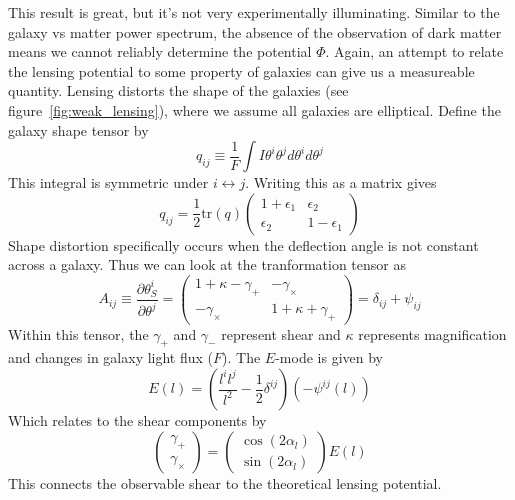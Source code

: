 This result is great, but it's not very experimentally illuminating. Similar to the galaxy vs matter power spectrum, the absence of the observation of dark matter means we cannot reliably determine the potential $\Phi$. Again, an attempt to relate the lensing potential to some property of galaxies can give us a measureable quantity. Lensing distorts the shape of the galaxies (see figure~\ref{fig:weak_lensing}), where we assume all galaxies are elliptical. Define the galaxy shape tensor by
\begin{equation}
	q_{ij} \equiv \frac{1}{F}\int I\theta^i\theta^j d\theta^i d\theta^j
\end{equation}
This integral is symmetric under $i \leftrightarrow j$. Writing this as a matrix gives
\begin{equation}
	q_{ij} = \frac{1}{2} \text{tr}(q) \left( 
	\begin{array}{cc}
	1+\epsilon_1 & \epsilon_2 \\
	\epsilon_2 & 1-\epsilon_1
	\end{array}
	\right)
\end{equation}
Shape distortion specifically occurs when the deflection angle is not constant across a galaxy. Thus we can look at the tranformation tensor as
\begin{equation}
	A_{ij} \equiv \frac{\partial \theta^i_S}{\partial\theta^j} = \left( 
	\begin{array}{cc}
	1+\kappa - \gamma_+ & -\gamma_\times \\
	-\gamma_\times & 1+\kappa+\gamma_+
	\end{array}
	\right) = \delta_{ij}+\psi_{ij}
\end{equation}
Within this tensor, the $\gamma_+$ and $\gamma_-$ represent shear and $\kappa$ represents magnification and changes in galaxy light flux ($F$). The $E$-mode is given by
\begin{equation}
	E(l) = \left( \frac{l^il^j}{l^2} - \frac{1}{2}\delta^{ij} \right)(-\psi^{ij}(l))
\end{equation}
Which relates to the shear components by
\begin{equation}
	\left(
	\begin{array}{c}
	\gamma_+ \\
	\gamma_\times
	\end{array}
	\right)
	=
	\left(
	\begin{array}{c}
	\cos(2\alpha_l) \\
	\sin(2\alpha_l)
	\end{array}
	\right)
	E(l)
\end{equation}
This connects the observable shear to the theoretical lensing potential.
